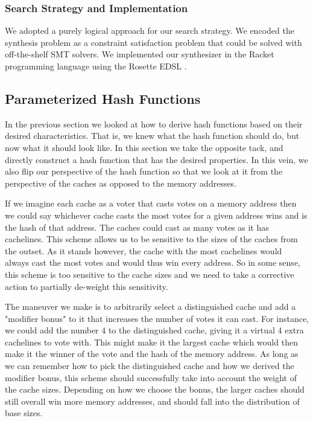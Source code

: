 \subsubsection{Search Strategy and Implementation}

We adopted a purely logical approach for our search strategy. We encoded the
synthesis problem as a constraint satisfaction problem that could be solved with
off-the-shelf SMT solvers. We implemented our synthesizer in the Racket
programming language using the Rosette EDSL \cite{rosette}.


\subsection{Parameterized Hash Functions}

In the previous section we looked at how to derive hash functions based on their
desired characteristics. That is, we knew what the hash function should do, but
now what it should look like. In this section we take the opposite tack, and
directly construct a hash function that has the desired properties. In this
vein, we also flip our perspective of the hash function so that we look at it
from the perspective of the caches as opposed to the memory addresses.

If we imagine each cache as a voter that casts votes on a memory address then we
could say whichever cache casts the most votes for a given address wins and is
the hash of that address. The caches could cast as many votes as it has
cachelines. This scheme allows us to be sensitive to the sizes of the caches
from the outset. As it stands however, the cache with the most cachelines would
always cast the most votes and would thus win every address.  So in some sense,
this scheme is too sensitive to the cache sizes and we need to take a corrective
action to partially de-weight this sensitivity.

The maneuver we make is to arbitrarily select a distinguished cache and add a
"modifier bonus" to it that increases the number of votes it can cast. For
instance, we could add the number 4 to the distinguished cache, giving it a
virtual 4 extra cachelines to vote with. This might make it the largest cache
which would then make it the winner of the vote and the hash of the memory
address. As long as we can remember how to pick the distinguished cache and how
we derived the modifier bonus, this scheme should successfully take into account
the weight of the cache sizes. Depending on how we choose the bonus, the larger
caches should still overall win more memory addresses, and should fall into the
distribution of base sizes.

